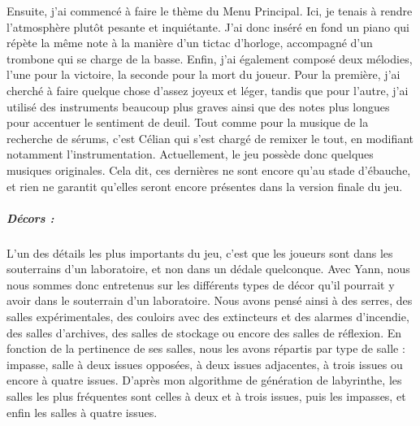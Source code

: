 \documentclass{article}
\begin{document}
Ensuite, j'ai commencé à faire le thème du Menu Principal. Ici, je tenais à rendre l'atmosphère plutôt pesante et inquiétante. J'ai donc inséré en fond un piano qui répète la même note à la manière d'un tictac d'horloge, accompagné d'un trombone qui se charge de la basse. Enfin, j'ai également composé deux mélodies, l'une pour la victoire, la seconde pour la mort du joueur. Pour la première, j'ai cherché à faire quelque chose d'assez joyeux et léger, tandis que pour l'autre, j'ai utilisé des instruments beaucoup plus graves ainsi que des notes plus longues pour accentuer le sentiment de deuil. Tout comme pour la musique de la recherche de sérums, c'est Célian qui s'est chargé de remixer le tout, en modifiant notamment l'instrumentation. Actuellement, le jeu possède donc quelques musiques originales. Cela dit, ces dernières ne sont encore qu'au stade d'ébauche, et rien ne garantit qu'elles seront encore présentes dans la version finale du jeu.

\subparagraph{Décors :}

L'un des détails les plus importants du jeu, c'est que les joueurs sont dans les souterrains d'un laboratoire, et non dans un dédale quelconque. Avec Yann, nous nous sommes donc entretenus sur les différents types de décor qu'il pourrait y avoir dans le souterrain d'un laboratoire. Nous avons pensé ainsi à des serres, des salles expérimentales, des couloirs avec des extincteurs et des alarmes d'incendie, des salles d'archives, des salles de stockage ou encore des salles de réflexion. En fonction de la pertinence de ses salles, nous les avons répartis par type de salle : impasse, salle à deux issues opposées, à deux issues adjacentes, à trois issues ou encore à quatre issues. D'après mon algorithme de génération de labyrinthe, les salles les plus fréquentes sont celles à deux et à trois issues, puis les impasses, et enfin les salles à quatre issues.
\end{document}
